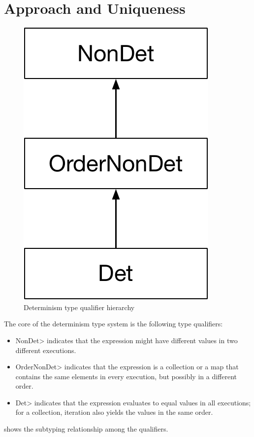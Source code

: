 \section{Approach and Uniqueness\label{sec:approach}}
\begin{figure}
    \begin{center}
        \includegraphics[scale=0.37]{detHierarchy}
    \end{center}
    \caption{Determinism type qualifier hierarchy}
    \label{fig:determinism-hierarchy}
\end{figure}

The core of the determinism type system is the following type qualifiers:
\begin{itemize}
    \item \<NonDet> indicates
    that the expression might have different values in two different executions.
    \item \<OrderNonDet> indicates that the expression is a collection or
    a map that contains the same elements in every execution, but possibly
    in a different order.
    \item \<Det> indicates that the expression evaluates to equal values in
    all executions; for a collection, iteration
    also yields the values in the same order.
\end{itemize}
 shows the subtyping
relationship among the qualifiers.

